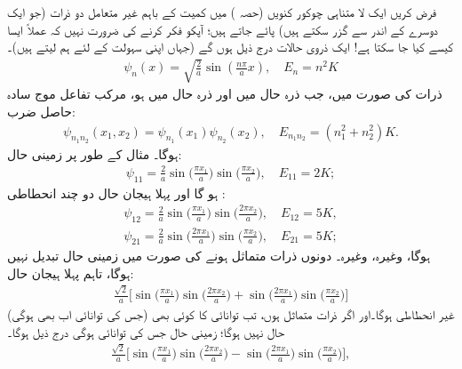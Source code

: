 

فرض کریں ایک لا متناہی چوکور کنویں  (حصہ )  میں کمیت   کے باہم غیر متعامل دو ذرات  (جو ایک دوسرے کے اندر سے گزر سکتے ہیں)  پائے جاتے ہیں؛ آپکو فکر کرنے کی ضرورت نہیں کہ عملاً  ایسا کیسے کیا جا سکتا ہے!  ایک ذروی حالات درج ذیل ہوں گے (جہاں اپنی سہولت  کے لئے ہم     لیتے ہیں)۔
\begin{align*}
 \psi_{n} (x)=\sqrt{\frac{2}{a}}\sin(\tfrac{n \pi}{a}x), \quad E_{n}=n^2 K 
\end{align*}
  ذرات کی صورت میں،  جب  ذرہ  حال    میں اور ذرہ  حال   میں ہو،  مرکب تفاعل موج سادہ حاصل ضرب:
\begin{align*}
 \psi_{n_{1} n_{2}} (x_{1},x_{2})=\psi_{n_{1}}(x_{1})\psi_{n_{2}}(x_{2}), \quad E_{n_{1} n_{2}}= (n_{1}^2+n_{2}^2)K. 
\end{align*}
 ہوگا۔ مثال کے طور پر زمینی حال:
\begin{align*}
 \psi_{11}=\frac{2}{a}\sin\big(\frac{\pi x_{1}}{a}\big) \sin\big(\frac{\pi x_{2}}{a}\big), \quad E_{11}=2K; 
\end{align*}
ہو گا اور پہلا ہیجان حال دو چند انحطاطی :
\begin{align*}
 \psi_{12}=\frac{2}{a}\sin\big(\frac{\pi x_{1}}{a}\big) \sin\big(\frac{2\pi x_{2}}{a}\big), \quad E_{12}=5K, \\
\psi_{21}=\frac{2}{a}\sin\big(\frac{2\pi x_{1}}{a}\big) \sin\big(\frac{\pi x_{2}}{a}\big), \quad E_{21}=5K; 
\end{align*}
ہوگا، وغیرہ،  وغیرہ۔ دونوں ذرات متماثل ہونے کی صورت میں زمینی حال تبدیل نہیں ہوگا،  تاہم پہلا ہیجان حال:
\begin{align*}
\frac{\sqrt{2}}{a}\big[\sin\big(\frac{\pi x_{1}}{a}\big)\sin\big(\frac{2\pi x_{2}}{a}\big)+ \sin\big(\frac{2 \pi x_{1}}{a}\big)\sin\big(\frac{\pi x_{2}}{a}\big)\big]
\end{align*} 
 (جس کی توانائی اب بھی   ہوگی)  غیر انحطاطی ہوگا۔اور اگر ذرات متماثل  ہوں، تب     توانائی کا  کوئی بھی  حال نہیں ہوگا؛   زمینی حال جس کی توانائی   ہوگی  درج ذیل ہوگا۔
\begin{align*}
\frac{\sqrt{2}}{a}\big[\sin\big(\frac{\pi x_{1}}{a}\big) \sin\big(\frac{2 \pi x_{2}}{a}\big)- \sin\big(\frac{2 \pi x_{1}}{a}\big) \sin\big(\frac{\pi x_{2}}{a}\big)\big], 
\end{align*}
